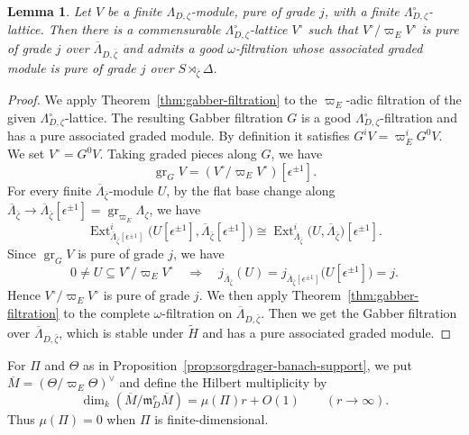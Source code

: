 \documentclass[11pt]{article}
\newtheorem{lemma}[theorem]{Lemma}
\theoremstyle{definition}
\newcommand{\mD}{\mathfrak m_D}
\newcommand{\gr}{\operatorname{gr}}
\begin{document}
\begin{lemma}\label{lem:iwasawa-pure-lattice}
Let $V$ be a finite $\Lambda_{D,\zeta}$-module, pure of grade $j$, 
with a finite $\Lambda_{D, \zeta}^\circ$-lattice.
Then there is a commensurable $\Lambda_{D, \zeta}^\circ$-lattice $V^\circ$ such that
$V^\circ/\varpi_EV^\circ$ is pure of grade $j$ over $\overline\Lambda_{D, \bar\zeta}$
and admits a %
good $\omega$-filtration whose
associated graded module is pure of grade $j$ over $S\rtimes_{\bar{\zeta}}\Delta$.
\end{lemma}
\begin{proof}
We apply Theorem~\ref{thm:gabber-filtration} to the $\varpi_E$-adic filtration
of the given $\Lambda_{D, \zeta}^\circ$-lattice.
The resulting Gabber filtration $G$ is a good $\Lambda_{D, \zeta}^\circ$-filtration and has a pure associated
graded module. By definition it satisfies $G^iV=\varpi_E^iG^0V$. We set $V^\circ=G^0V$. Taking graded pieces along $G$, we have
\[
 \gr_GV=(V^\circ/\varpi_EV^\circ)[\epsilon^{\pm1}].
\]
For every finite $\overline\Lambda_{\bar\zeta}$-module $U$,
by the flat base change along $\overline\Lambda_{\bar\zeta}\to\overline\Lambda_{\bar\zeta}[\epsilon^{\pm1}]=\gr_{\varpi_E}\Lambda_{\zeta}$, we have
\[
 \operatorname{Ext}_{\overline\Lambda_{\bar\zeta}[\epsilon^{\pm1}]}^i
 \bigl(U[\epsilon^{\pm1}],
       \overline\Lambda_{\bar\zeta}[\epsilon^{\pm1}]\bigr)
 \cong\operatorname{Ext}_{\overline\Lambda_{\bar\zeta}}^i
 \bigl(U,\overline\Lambda_{\bar\zeta}\bigr)[\epsilon^{\pm1}].
\]
Since $\gr_GV$ is pure of grade $j$, we have
\[
 0\ne U\subseteq V^\circ/\varpi_EV^\circ
 \quad\Rightarrow\quad
 j_{\overline\Lambda_{\bar\zeta}}(U)
 =j_{\overline\Lambda_{\bar\zeta}[\epsilon^{\pm1}]}
      \bigl(U[\epsilon^{\pm1}]\bigr)=j.
\]
Hence $V^\circ/\varpi_EV^\circ$ is pure of grade $j$.
We then apply Theorem~\ref{thm:gabber-filtration} 
to the complete $\omega$-filtration on $\overline\Lambda_{D, \bar\zeta}$. 
Then we get the Gabber filtration over $\overline{\Lambda}_{D, \bar\zeta}$,
which is stable under $\widetilde{H}$ and has a pure associated graded module. 
\end{proof}

For $\Pi$ and $\Theta$ as in
Proposition~\ref{prop:sorgdrager-banach-support}, we put
$\overline M=(\Theta/\varpi_E\Theta)^\vee$ and define the Hilbert
multiplicity by
\[
 \dim_k(\overline M/\mD^r\overline M)
 =\mu(\Pi)r+O(1)\qquad(r\longrightarrow\infty).
\]
Thus $\mu(\Pi)=0$ when $\Pi$ is finite-dimensional.
\end{document}
